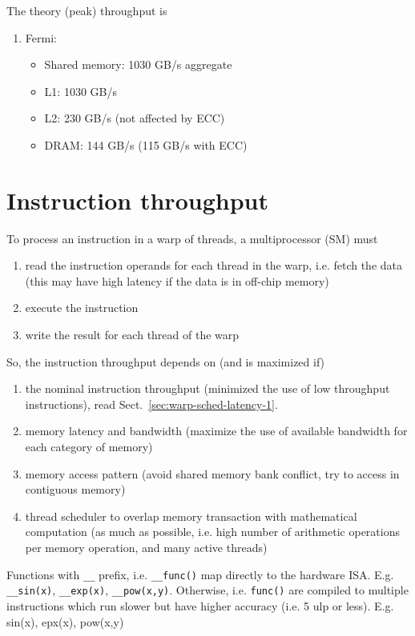 The theory (peak) throughput is
\begin{enumerate}
\item Fermi: 
  \begin{itemize}
  \item Shared memory: 1030 GB/s aggregate
  \item L1: 1030 GB/s
  \item L2: 230 GB/s (not affected by ECC)
  \item DRAM: 144 GB/s (115 GB/s with ECC)
  \end{itemize}
\end{enumerate}

\section{Instruction throughput}
\label{sec:instr-thro-flow}

To process an instruction in a warp of threads, a multiprocessor (SM)
must
\begin{enumerate}
\item read the instruction operands for each thread in the warp,
  i.e. fetch the data (this may have high latency if the data is in
  off-chip memory)
\item execute the instruction
\item write the result for each thread of the warp
\end{enumerate}
So, the instruction throughput depends on (and is maximized if)
\begin{enumerate}
\item the nominal instruction throughput (minimized the use of low
  throughput instructions), read
  Sect.~\ref{sec:warp-sched-latency-1}. 

\item memory latency and bandwidth (maximize the use of available
  bandwidth for each category of memory)
\item memory access pattern (avoid shared memory bank conflict, try to
  access in contiguous memory)
\item thread scheduler to overlap memory transaction with mathematical
  computation (as much as possible, i.e. high number of arithmetic
  operations per memory operation, and many active threads)
\end{enumerate}

Functions with \verb!__! prefix, i.e. \verb!__func()! map directly to
the hardware ISA. E.g. \verb!__sin(x)!, \verb!__exp(x)!,
\verb!__pow(x,y)!. Otherwise, i.e. \verb!func()! are compiled to
multiple instructions which run slower but have higher accuracy
(i.e. 5 ulp or less). E.g. sin(x), epx(x), pow(x,y)

